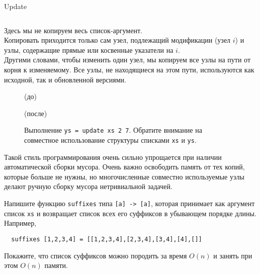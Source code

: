 \begin{frame}[fragile]{Update}
\inputminted[firstline=60,lastline=64] {haskell}{code/Stacks.hs}
Здесь мы не копируем весь список-аргумент.\\

Копировать приходится
только сам узел, подлежащий модификации (узел $i$) и узлы,
содержащие прямые или косвенные указатели на $i$. \\

Другими словами,
чтобы изменить один узел, мы копируем все узлы на пути от корня
к изменяемому. Все узлы, не находящиеся на этом пути, используются как
исходной, так и обновленной версиями. 
\end{frame}

\begin{frame}[fragile]{}
\begin{figure}[h]
	\centering
	\par
	(до)\par
	\vspace{0.5cm}
	\par
	(после)\par
	\vspace{0.5cm}	
	\caption{Выполнение \texttt{ys = update xs 2 7}. Обратите
		внимание на совместное использование структуры списками \texttt{xs} и \texttt{ys}.}
	\label{fig:2.6}
\end{figure}
\end{frame}

\begin{frame}[fragile]
\begin{remark}
	Такой стиль программирования очень сильно упрощается при наличии
	автоматической сборки мусора. Очень важно освободить память от тех
	копий, которые больше не нужны, но многочисленные совместно используемые
	узлы делают ручную сборку мусора нетривиальной задачей.
\end{remark}
\begin{exercise}\label{ex:2.1}
  Напишите функцию \texttt{suffixes} типа \texttt{[a] -> [a]}, которая принимает как
  аргумент список \texttt{xs} и возвращает список всех его
  суффиксов в убывающем порядке длины. Например,
  \begin{verbatim}
  suffixes [1,2,3,4] = [[1,2,3,4],[2,3,4],[3,4],[4],[]]
  \end{verbatim}
  Покажите, что список суффиксов можно породить за время $O(n)$ и
  занять при этом $O(n)$ памяти.
\end{exercise}

\end{frame}

